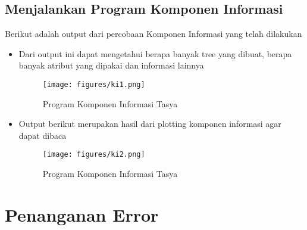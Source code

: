 \subsection{Menjalankan Program Komponen Informasi}
Berikut adalah output dari percobaan Komponen Informasi yang telah dilakukan
\begin{itemize}
\item Dari output ini dapat mengetahui berapa banyak tree yang dibuat, berapa banyak atribut yang dipakai dan informasi lainnya
\begin{figure}[ht]
\centering
\texttt{[image: figures/ki1.png]}
\caption{Program Komponen Informasi Tasya}
\label{Praktek}
\end{figure}

\item Output berikut merupakan hasil dari plotting komponen informasi agar dapat dibaca
\begin{figure}[ht]
\centering
\texttt{[image: figures/ki2.png]}
\caption{Program Komponen Informasi Tasya}
\label{Praktek}
\end{figure}
\end{itemize}

\section{Penanganan Error}
